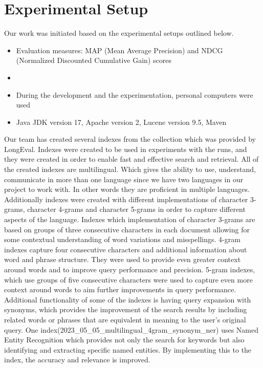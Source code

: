 \section{Experimental Setup}
\label{sec:setup}

Our work was initiated based on the experimental setups outlined below.
\begin{itemize}
	\item Evaluation measures: MAP (Mean Average Precision) and NDCG (Normalized Discounted Cumulative Gain) scores
	\item \citep[Repository]{jihuming}
	\item During the development and the experimentation, personal computers were used
	\item Java JDK version 17, Apache version 2, Lucene version 9.5, Maven
\end{itemize}
Our team has created several indexes from the collection which was provided by LongEval. Indexes were created to be used in experiments with the runs, and they were created in order to enable fast and effective search and retrieval. 
All of the created indexes are multilingual. Which gives the ability to use, understand, communicate in more than one language since we have two languages in our project to work with.  In other words they are proficient in multiple languages. 
Additionally indexes were created with different implementations of character 3-grams,  character 4-grams and character 5-grams in order to capture different aspects of the language. Indexes which implementation of character 3-grams are based on groups of three consecutive characters in each document allowing for some contextual understanding of word variations and misspellings. 4-gram indexes capture four consecutive characters and additional information about word and phrase structure. They were used to provide even greater context around words and to improve query performance and precision. 5-gram indexes, which use groups of five consecutive characters were used to capture even more context around words to aim further improvements in query performance. 
Additional functionality of some of the indexes is having query expansion with synonyms, which provides the improvement of the search results by including related words or phrases that are equivalent in meaning to the user's original query. 
One index(2023\_05\_05\_multilingual\_4gram\_synonym\_ner) uses Named Entity Recognition which provides not only the search for keywords but also identifying and extracting specific named entities. By implementing this to the index, the accuracy and relevance is improved.
